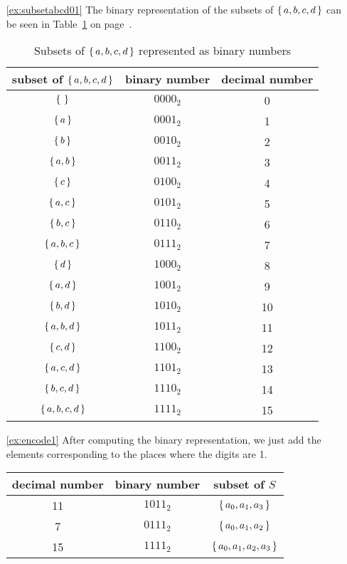 \begin{enumerate}
\item[\ref{ex:subsetabcd01}]
The binary representation of the subsets of $\left\{\,a, b, c, d\,\right\}$ can be seen in Table~\ref{tab:abcdbinary} on page~\pageref{tab:abcdbinary}. 
\begin{table}[!htb]
\caption{Subsets of $\left\{\,a, b, c, d\,\right\}$ represented as binary numbers}\label{tab:abcdbinary}
\begin{center}
\begin{tabular}{c|c|c}
subset of $\left\{\,a, b, c, d\,\right\}$ & binary number & decimal number \\
\hline
$\left\{\,\,\right\}$ & $0000_2$ & 0 \\
$\left\{\,a\,\right\}$ & $0001_2$ & 1 \\
$\left\{\,b\,\right\}$ & $0010_2$ & 2 \\
$\left\{\,a, b\,\right\}$ & $0011_2$ & 3 \\
$\left\{\,c\,\right\}$ & $0100_2$ & 4 \\
$\left\{\,a, c\,\right\}$ & $0101_2$ & 5 \\
$\left\{\,b, c\,\right\}$ & $0110_2$ & 6 \\
$\left\{\,a, b,c \,\right\}$ & $0111_2$ & 7 \\
$\left\{\,d\,\right\}$ & $1000_2$ & 8 \\
$\left\{\,a, d\,\right\}$ & $1001_2$ & 9 \\
$\left\{\,b, d\,\right\}$ & $1010_2$ & 10 \\
$\left\{\,a, b, d\,\right\}$ & $1011_2$ & 11 \\
$\left\{\,c, d\,\right\}$ & $1100_2$ & 12 \\
$\left\{\,a, c, d\,\right\}$ & $1101_2$ & 13 \\
$\left\{\,b, c, d\,\right\}$ & $1110_2$ & 14 \\
$\left\{\,a, b, c, d\,\right\}$ & $1111_2$ & 15 
\end{tabular}
\end{center}
\end{table}

\item[\ref{ex:encode1}]
After computing the binary representation, 
we just add the elements corresponding to the places where the digits are 1. 
\begin{center}
\begin{tabular}{c|c|c}
decimal number & binary number & subset of $S$ \\
\hline 
11 & $1011_2$ & $\left\{\,a_0, a_1, a_3\,\right\}$ \\
7 & $0111_2$ & $\left\{\,a_0, a_1, a_2\,\right\}$ \\
15 & $1111_2$ & $\left\{\,a_0, a_1, a_2, a_3\,\right\}$
\end{tabular}
\end{center}


\end{enumerate}
